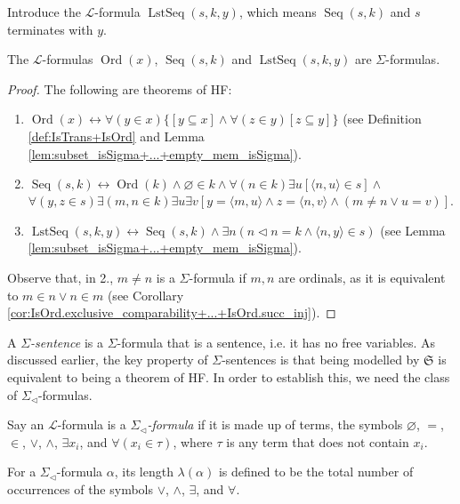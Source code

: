 \begin{lemma}
    \label{lem:Ord_isSigma+Seq_isSigma+LstSeq_isSigma}
    Introduce the $\mathcal{L}$-formula $\operatorname{LstSeq}(s,k,y)$, which means
    $\operatorname{Seq}(s,k)$ and $s$ terminates with $y$.
    
    The $\mathcal{L}$-formulas $\operatorname{Ord}(x)$, $\operatorname{Seq}(s,k)$ and
    $\operatorname{LstSeq}(s,k,y)$ are $\Sigma$-formulas.
\end{lemma}

\begin{proof}
    The following are theorems of HF:
    \begin{enumerate}
        \item $\operatorname{Ord}(x) \leftrightarrow 
        \forall(y \in x)\{[y \subseteq x] \land \forall(z \in y)[z \subseteq y]\}$ (see 
        Definition \ref{def:IsTrans+IsOrd} and 
        Lemma \ref{lem:subset_isSigma+...+empty_mem_isSigma}).
        \item $\operatorname{Seq}(s, k) \leftrightarrow \operatorname{Ord}(k) 
            \land \varnothing \in k \land \forall(n \in k) \exists u[\langle n, u\rangle \in s] 
            \land$
            $\forall(y, z \in s) \exists(m, n \in k) \exists u \exists v[y=\langle m, u\rangle 
            \land z=\langle n, v\rangle \land(m \neq n \lor u=v)]$.
        \item $\operatorname{LstSeq}(s, k, y) \leftrightarrow \operatorname{Seq}(s, k) 
            \land \exists n(n \lhd n=k \land\langle n, y\rangle \in s)$ 
            (see Lemma \ref{lem:subset_isSigma+...+empty_mem_isSigma}).
    \end{enumerate}
    Observe that, in 2., $m \neq n$ is a $\Sigma$-formula if $m,n$ are ordinals, as
    it is equivalent to $m \in n \lor n \in m$ 
    (see Corollary \ref{cor:IsOrd.exclusive_comparability+...+IsOrd.succ_inj}).
\end{proof}

A \textit{$\Sigma$-sentence} is a $\Sigma$-formula that is a sentence, 
i.e. it has no free variables. 
As discussed earlier, the key property of $\Sigma$-sentences is that 
being modelled by $\mathfrak{S}$ is equivalent to being a theorem of HF.
In order to establish this, we need the class of $\Sigma_{\lhd}$-formulas.

\begin{definition}
    \label{def:IsSigma_lhd}
    Say an $\mathcal{L}$-formula is a \textit{$\Sigma_{\lhd}$-formula} if it is made up
    of terms, the symbols ${\varnothing}$, ${=}$, ${\in}$, ${\lor}$, ${\land}$, ${\exists x_i}$,
    and ${\forall(x_i \in \tau)}$, where $\tau$ is any term that does not contain $x_i$.

    For a $\Sigma_{\lhd}$-formula $\alpha$, its length $\lambda(\alpha)$ is defined to be 
    the total number of occurrences of the symbols $\lor$, $\land$, $\exists$, and $\forall$.
\end{definition}

